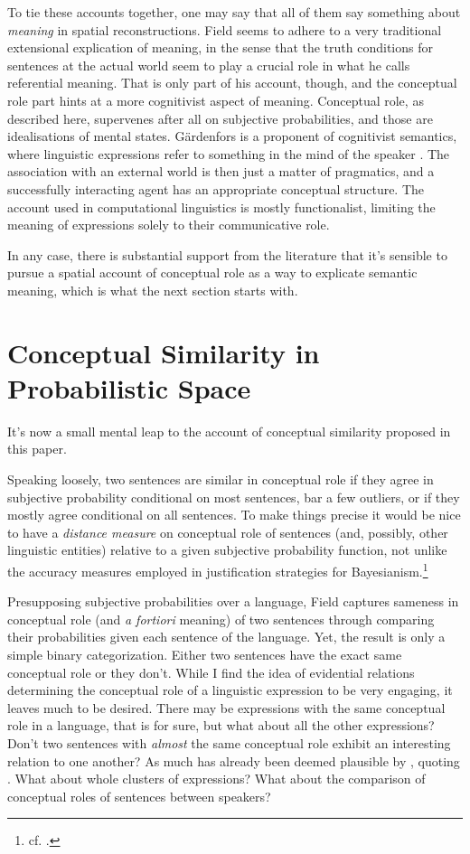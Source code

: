 \documentclass[11pt, a4paper]{scrartcl}
\renewcommand{\i}[1]{\emph{#1}}
\begin{document}
To tie these accounts together, one may say that all of them say something about \i{meaning} in spatial reconstructions. Field seems to adhere to a very traditional extensional explication of meaning, in the sense that the truth conditions for sentences at the actual world seem to play a crucial role in what he calls referential meaning. That is only part of his account, though, and the conceptual role part hints at a more cognitivist aspect of meaning. Conceptual role, as described here, supervenes after all on subjective probabilities, and those are idealisations of mental states. Gärdenfors is a proponent of cognitivist semantics, where linguistic expressions refer to something in the mind of the speaker \parencite[154]{gärdenfors2004conceptual}. The association with an external world is then just a matter of pragmatics, and a successfully interacting agent has an appropriate conceptual structure. The account used in computational linguistics is mostly functionalist, limiting the meaning of expressions solely to their communicative role. 

In any case, there is substantial support from the literature that it's sensible to pursue a spatial account of conceptual role as a way to explicate semantic meaning, which is what the next section starts with.

\section{Conceptual Similarity in Probabilistic Space}

It's now a small mental leap to the account of conceptual similarity proposed in this paper. 

Speaking loosely, two sentences are similar in conceptual role if they agree in subjective probability conditional on most sentences, bar a few outliers, or if they mostly agree conditional on all sentences. To make things precise it would be nice to have a \i{distance measure} on conceptual role of sentences (and, possibly, other linguistic entities) relative to a given subjective probability function, not unlike the accuracy measures employed in justification strategies for Bayesianism.\footnote{cf. \textcite{Leitgeb2010}.}

Presupposing subjective probabilities over a language, Field captures sameness in conceptual role (and \i{a fortiori} meaning) of two sentences through comparing their probabilities given each sentence of the language. Yet, the result is only a simple binary categorization. Either two sentences have the exact same conceptual role or they don't. While I find the idea of evidential relations determining the conceptual role of a linguistic expression to be very engaging, it leaves much to be desired. There may be expressions with the same conceptual role in a language, that is for sure, but what about all the other expressions? Don't two sentences with \i{almost} the same conceptual role exhibit an interesting relation to one another? As much has already been deemed plausible by \textcite{Leitgeb2008-LEIAIR}, quoting \textcite{Goodman1949-GOOOLO}. What about whole clusters of expressions? What about the comparison of conceptual roles of sentences between speakers? 
\end{document}
